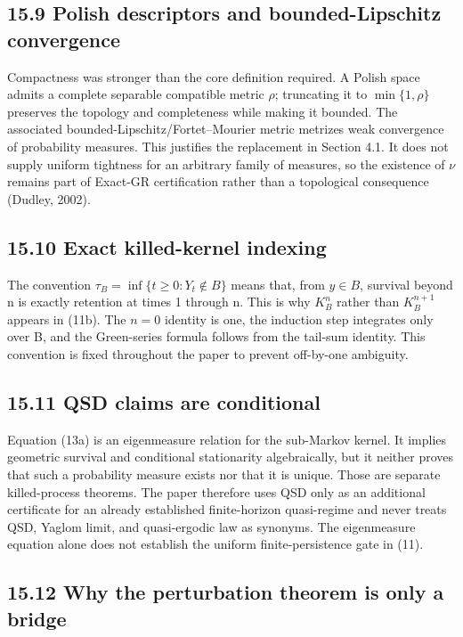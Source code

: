 \documentclass[10pt]{article}
\begin{document}
\subsection{15.9 Polish descriptors and bounded-Lipschitz convergence}\label{polish-descriptors-proof-note}

Compactness was stronger than the core definition required. A Polish space admits a complete separable compatible metric $\rho$; truncating it to $\min\{1,\rho\}$ preserves the topology and completeness while making it bounded. The associated bounded-Lipschitz/Fortet--Mourier metric metrizes weak convergence of probability measures. This justifies the replacement in Section 4.1. It does not supply uniform tightness for an arbitrary family of measures, so the existence of $\nu$ remains part of Exact-GR certification rather than a topological consequence (Dudley, 2002).

\subsection{15.10 Exact killed-kernel indexing}\label{killed-kernel-indexing-proof-note}

The convention $\tau_B=\inf\{t\ge0:Y_t\notin B\}$ means that, from $y\in B$, survival beyond n is exactly retention at times 1 through n. This is why $K_B^n$ rather than $K_B^{n+1}$ appears in (11b). The $n=0$ identity is one, the induction step integrates only over B, and the Green-series formula follows from the tail-sum identity. This convention is fixed throughout the paper to prevent off-by-one ambiguity.

\subsection{15.11 QSD claims are conditional}\label{qsd-conditional-proof-note}

Equation (13a) is an eigenmeasure relation for the sub-Markov kernel. It implies geometric survival and conditional stationarity algebraically, but it neither proves that such a probability measure exists nor that it is unique. Those are separate killed-process theorems. The paper therefore uses QSD only as an additional certificate for an already established finite-horizon quasi-regime and never treats QSD, Yaglom limit, and quasi-ergodic law as synonyms. The eigenmeasure equation alone does not establish the uniform finite-persistence gate in (11).

\subsection{15.12 Why the perturbation theorem is only a bridge}\label{perturbation-bridge-proof-note}
\end{document}
